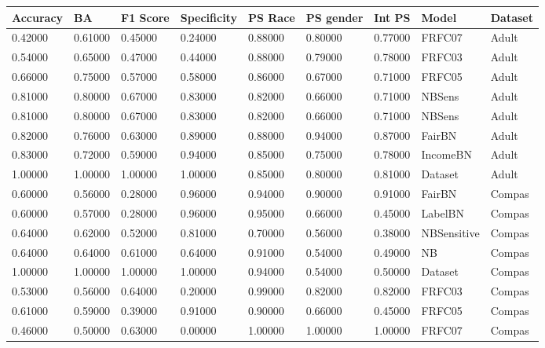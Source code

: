 \begin{landscape}
\begin{table}[H]
\centering
\begin{tabular}{|l|l|l|l|l|l|l|l|l|}
\hline
\textbf{Accuracy} & \textbf{BA} & \textbf{F1 Score} & \textbf{Specificity} & \textbf{PS Race} & \textbf{PS gender} & \textbf{Int PS} & \textbf{Model} & \textbf{Dataset} \\ \hline
0.42000 & 0.61000 & 0.45000 & 0.24000 & 0.88000 & 0.80000 & 0.77000 & FRFC07      & Adult  \\ \hline
0.54000 & 0.65000 & 0.47000 & 0.44000 & 0.88000 & 0.79000 & 0.78000 & FRFC03      & Adult  \\ \hline
0.66000 & 0.75000 & 0.57000 & 0.58000 & 0.86000 & 0.67000 & 0.71000 & FRFC05      & Adult  \\ \hline
0.81000 & 0.80000 & 0.67000 & 0.83000 & 0.82000 & 0.66000 & 0.71000 & NBSens      & Adult  \\ \hline
0.81000 & 0.80000 & 0.67000 & 0.83000 & 0.82000 & 0.66000 & 0.71000 & NBSens      & Adult  \\ \hline
0.82000 & 0.76000 & 0.63000 & 0.89000 & 0.88000 & 0.94000 & 0.87000 & FairBN      & Adult  \\ \hline
0.83000 & 0.72000 & 0.59000 & 0.94000 & 0.85000 & 0.75000 & 0.78000 & IncomeBN    & Adult  \\ \hline
1.00000 & 1.00000 & 1.00000 & 1.00000 & 0.85000 & 0.80000 & 0.81000 & Dataset     & Adult  \\ \hline
0.60000 & 0.56000 & 0.28000 & 0.96000 & 0.94000 & 0.90000 & 0.91000 & FairBN      & Compas \\ \hline
0.60000 & 0.57000 & 0.28000 & 0.96000 & 0.95000 & 0.66000 & 0.45000 & LabelBN     & Compas \\ \hline
0.64000 & 0.62000 & 0.52000 & 0.81000 & 0.70000 & 0.56000 & 0.38000 & NBSensitive & Compas \\ \hline
0.64000 & 0.64000 & 0.61000 & 0.64000 & 0.91000 & 0.54000 & 0.49000 & NB          & Compas \\ \hline
1.00000 & 1.00000 & 1.00000 & 1.00000 & 0.94000 & 0.54000 & 0.50000 & Dataset     & Compas \\ \hline
0.53000 & 0.56000 & 0.64000 & 0.20000 & 0.99000 & 0.82000 & 0.82000 & FRFC03      & Compas \\ \hline
0.61000 & 0.59000 & 0.39000 & 0.91000 & 0.90000 & 0.66000 & 0.45000 & FRFC05      & Compas \\ \hline
0.46000 & 0.50000 & 0.63000 & 0.00000 & 1.00000 & 1.00000 & 1.00000 & FRFC07      & Compas \\ \hline
\end{tabular}
\end{table}
\end{landscape}